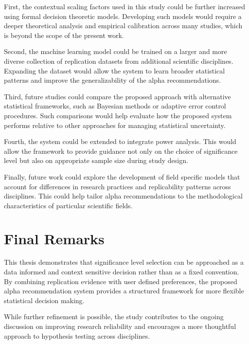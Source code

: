 First, the contextual scaling factors used in this study could be further increased using formal decision theoretic models. Developing such models would require a deeper theoretical analysis and empirical calibration across many studies, which is beyond the scope of the present work.

Second, the machine learning model could be trained on a larger and more diverse collection of replication datasets from additional scientific disciplines. Expanding the dataset would allow the system to learn broader statistical patterns and improve the generalizability of the alpha recommendations.

Third, future studies could compare the proposed approach with alternative statistical frameworks, such as Bayesian methods \cite{Berger1985} or adaptive error control procedures\cite{Benjamini1995}. Such comparisons would help evaluate how the proposed system performs relative to other approaches for managing statistical uncertainty.

Fourth, the system could be extended to integrate power analysis. This would allow the framework to provide guidance not only on the choice of significance level but also on appropriate sample size during study design.

Finally, future work could explore the development of field specific models that account for differences in research practices and replicability patterns across disciplines. This could help tailor alpha recommendations to the methodological characteristics of particular scientific fields.

\section{Final Remarks}

This thesis demonstrates that significance level selection can be approached as a data informed and context sensitive decision rather than as a fixed convention. By combining replication evidence with user defined preferences, the proposed alpha recommendation system provides a structured framework for more flexible statistical decision making.

While further refinement is possible, the study contributes to the ongoing discussion on improving research reliability and encourages a more thoughtful approach to hypothesis testing across disciplines.
